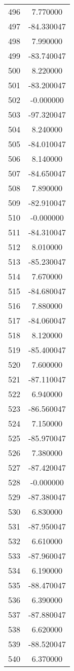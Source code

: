 \documentclass[12pt]{article}
\begin{document}
\begin{longtable}{@{}cc@{}}
496 & 7.770000 \\
497 & -84.330047 \\
498 & 7.990000 \\
499 & -83.740047 \\
500 & 8.220000 \\
501 & -83.200047 \\
502 & -0.000000 \\
503 & -97.320047 \\
504 & 8.240000 \\
505 & -84.010047 \\
506 & 8.140000 \\
507 & -84.650047 \\
508 & 7.890000 \\
509 & -82.910047 \\
510 & -0.000000 \\
511 & -84.310047 \\
512 & 8.010000 \\
513 & -85.230047 \\
514 & 7.670000 \\
515 & -84.680047 \\
516 & 7.880000 \\
517 & -84.060047 \\
518 & 8.120000 \\
519 & -85.400047 \\
520 & 7.600000 \\
521 & -87.110047 \\
522 & 6.940000 \\
523 & -86.560047 \\
524 & 7.150000 \\
525 & -85.970047 \\
526 & 7.380000 \\
527 & -87.420047 \\
528 & -0.000000 \\
529 & -87.380047 \\
530 & 6.830000 \\
531 & -87.950047 \\
532 & 6.610000 \\
533 & -87.960047 \\
534 & 6.190000 \\
535 & -88.470047 \\
536 & 6.390000 \\
537 & -87.880047 \\
538 & 6.620000 \\
539 & -88.520047 \\
540 & 6.370000 \\

\end{longtable}
\end{document}
